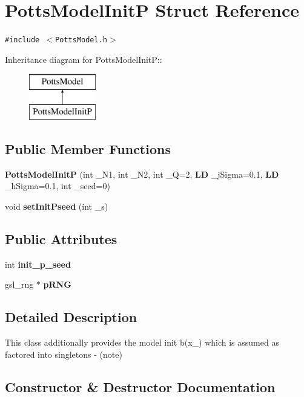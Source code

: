 \section{PottsModelInitP Struct Reference}
\label{structPottsModelInitP}
{\tt \#include $<$PottsModel.h$>$}

Inheritance diagram for PottsModelInitP::\begin{figure}[H]
\begin{center}
\leavevmode
\includegraphics[height=2cm]{structPottsModelInitP}
\end{center}
\end{figure}
\subsection*{Public Member Functions}
\begin{CompactItemize}
\item 
{\bf PottsModelInitP} (int \_\-N1, int \_\-N2, int \_\-Q=2, {\bf LD} \_\-jSigma=0.1, {\bf LD} \_\-hSigma=0.1, int \_\-seed=0)
\item 
void {\bf setInitPseed} (int \_\-s)
\end{CompactItemize}
\subsection*{Public Attributes}
\begin{CompactItemize}
\item 
int {\bf init\_\-p\_\-seed}
\item 
gsl\_\-rng $\ast$ {\bf pRNG}
\end{CompactItemize}


\subsection{Detailed Description}
This class additionally provides the model init b(x\_) which is assumed as factored into singletons - (note) 



\subsection{Constructor \& Destructor Documentation}

